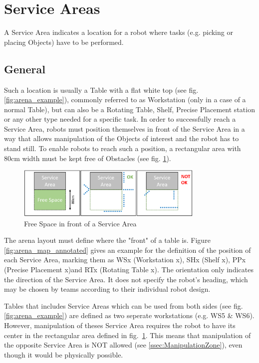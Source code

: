 \clearpage

\section{Service Areas}
\label{sec:Service_Areas}
A Service Area indicates a location for a robot where tasks (e.g. picking or placing Objects) have to be performed.
\subsection{General} 
\label{subsec:Service_Areas_General}


Such a location is usually a Table with a flat white top (see fig. \ref{fig:arena_example}), commonly referred to as Workstation (only in a case of a normal Table), but can also be a Rotating Table, Shelf, Precise Placement station or any other type needed for a specific task.
In order to successfully reach a Service Area, robots must position themselves in front of the Service Area in a way that allows manipulation of the Objects of interest and the robot has to stand still. To enable robots to reach such a position, a rectangular area with $80\si{\centi\meter}$ width must be kept free of Obstacles (see fig. \ref{fig:arena_service_area_free}). 

\begin{figure} [h!]
	\centering
	\includegraphics[width= 0.8\textwidth ]{./images/general_rules/arena_service_area_free_space}
	\caption{Free Space in front of a Service Area}
	\label{fig:arena_service_area_free}
\end{figure}

The arena layout must define where the "front" of a table is.
Figure \ref{fig:arena_map_annotated} gives an example for the definition of the position of each Service Area, marking them as WSx (Workstation x), SHx (Shelf x), PPx (Precise Placement x)and RTx (Rotating Table x). The orientation only indicates the direction of the Service Area. It does not specify the robot's heading, which may be chosen by teams according to their individual robot design.

Tables that includes Service Areas which can be used from both sides (see fig. \ref{fig:arena_example}) are defined as two seperate workstations (e.g. WS5 \& WS6). However, manipulation of theses Service Area requires the robot to have its center in the rectangular area defined in fig.~\ref{fig:arena_service_area_free}. This means that manipulation of the opposite Service Area is NOT allowed (see \ref{ssec:ManipulationZone}), even though it would be physically possible.

